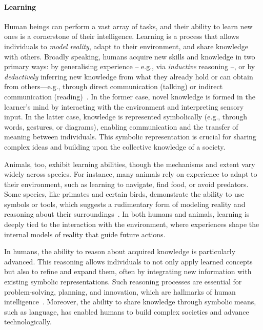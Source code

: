 \paragraph{Learning}
%
Human beings can perform a vast array of tasks, and their ability to learn new ones is a cornerstone of their intelligence.
%
Learning is a process that allows individuals to \emph{model reality}, adapt to their environment, and share knowledge with others.
%
Broadly speaking, humans acquire new skills and knowledge in two primary ways: by generalising experience -- e.g., via \emph{inductive} reasoning --, or by \emph{deductively} inferring new knowledge from what they already hold or can obtain from others---e.g., through direct communication (talking) or indirect communication (reading)~\cite{human-reasoning-1994}.
%
In the former case, novel knowledge is formed in the learner's mind by interacting with the environment and interpreting sensory input.
%
In the latter case, knowledge is represented symbolically (e.g., through words, gestures, or diagrams), enabling communication and the transfer of meaning between individuals.
%
This symbolic representation is crucial for sharing complex ideas and building upon the collective knowledge of a society.

Animals, too, exhibit learning abilities, though the mechanisms and extent vary widely across species.
%
For instance, many animals rely on experience to adapt to their environment, such as learning to navigate, find food, or avoid predators.
%
Some species, like primates and certain birds, demonstrate the ability to use symbols or tools, which suggests a rudimentary form of modeling reality and reasoning about their surroundings~\cite{shettleworth2010cognition}.
%
In both humans and animals, learning is deeply tied to the interaction with the environment, where experiences shape the internal models of reality that guide future actions.

In humans, the ability to reason about acquired knowledge is particularly advanced.
%
This reasoning allows individuals to not only apply learned concepts but also to refine and expand them, often by integrating new information with existing symbolic representations.
%
Such reasoning processes are essential for problem-solving, planning, and innovation, which are hallmarks of human intelligence~\cite{DBLP:journals/mima/LeggH07}.
%
Moreover, the ability to share knowledge through symbolic means, such as language, has enabled humans to build complex societies and advance technologically.


